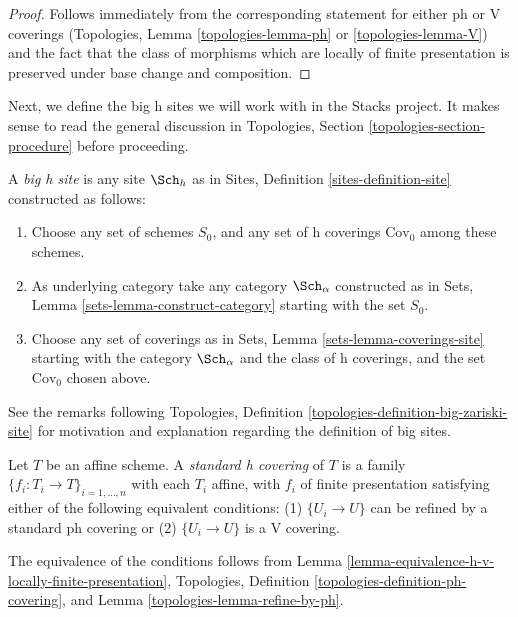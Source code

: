 \begin{proof}
Follows immediately from the corresponding statement for
either ph or V coverings
(Topologies, Lemma \ref{topologies-lemma-ph} or
\ref{topologies-lemma-V})
and the fact that the class of morphisms which are locally
of finite presentation is preserved under base change and
composition.
\end{proof}

\noindent
Next, we define the big h sites we will work with in the
Stacks project. It makes sense to read the general discussion
in Topologies, Section \ref{topologies-section-procedure}
before proceeding.

\begin{definition}
\label{definition-big-h-site}
A {\it big h site} is any site $\Sch_h$ as in
Sites, Definition \ref{sites-definition-site} constructed as follows:
\begin{enumerate}
\item Choose any set of schemes $S_0$, and any set of h coverings
$\text{Cov}_0$ among these schemes.
\item As underlying category take any category $\Sch_\alpha$
constructed as in Sets, Lemma \ref{sets-lemma-construct-category}
starting with the set $S_0$.
\item Choose any set of coverings as in
Sets, Lemma \ref{sets-lemma-coverings-site} starting with the
category $\Sch_\alpha$ and the class of h coverings,
and the set $\text{Cov}_0$ chosen above.
\end{enumerate}
\end{definition}

\noindent
See the remarks following
Topologies, Definition \ref{topologies-definition-big-zariski-site}
for motivation and explanation regarding the definition of big sites.

\begin{definition}
\label{definition-standard-h}
Let $T$ be an affine scheme. A {\it standard h covering} of $T$
is a family $\{f_i : T_i \to T\}_{i = 1, \ldots, n}$ with each $T_i$
affine, with $f_i$ of finite presentation satisfying either of the
following equivalent conditions: (1) $\{U_i \to U\}$ can be refined by
a standard ph covering or (2) $\{U_i \to U\}$ is a V covering.
\end{definition}

\noindent
The equivalence of the conditions follows from
Lemma \ref{lemma-equivalence-h-v-locally-finite-presentation},
Topologies, Definition \ref{topologies-definition-ph-covering}, and
Lemma \ref{topologies-lemma-refine-by-ph}.

